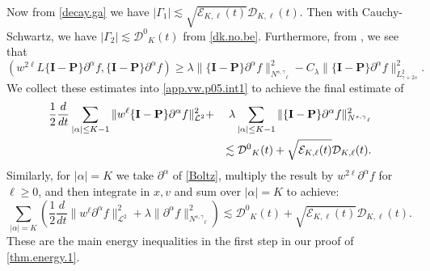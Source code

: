 \documentclass{amsart}
\numberwithin{equation}{section}
\begin{document}
Now from \eqref{decay.ga} we have 
$
\left| {\Gamma}_1 \right| 
\lesssim
\sqrt{{\mathcal{E}}_{{K},{\ell}}(t)}{\mathcal{D}}_{{K},{\ell}}(t).
$
Then with Cauchy-Schwartz, we have
$
\left| {\Gamma}_2 \right|
\lesssim
{{\mathcal{D}}^0}_{K}(t)
$
from \eqref{dk.no.be}.
Furthermore, from \cite[Lemma 2.6]{gsNonCut0}, we see that
$$
 \left( w^{2{\ell}}{L}\{{\mathbf{I}}-{\mathbf{P}}\}{\partial}^{\alpha} {f},\{{\mathbf{I}}-{\mathbf{P}}\} {\partial}^{\alpha}{f}\right)
 \ge {\lambda} \|  \{{\mathbf{I}}-{\mathbf{P}}\}{\partial}^{\alpha}{f}\|_{{N^{s,\gamma}}_{\ell}}^2
 -
 C_\lambda  \|\{{\mathbf{I}}-{\mathbf{P}}\}{\partial}^{\alpha}{f}\|_{L^2_{\gamma+2s}}^2.
$$
We collect these estimates into \eqref{app.vw.p05.int1} to achieve the final estimate of
\begin{eqnarray}
\frac{1}{2}\frac{d}{dt}\sum_{|{\alpha}| \le {K}-1} \|w^{\ell}\{{\mathbf{I}}-{\mathbf{P}}\}{\partial}^{\alpha}{f}\|_{{\mathcal{L}}^2}^2
&+&
{\lambda} \sum_{|{\alpha}| \le {K}-1}\|\{{\mathbf{I}}-{\mathbf{P}}\}{\partial}^{\alpha}{f}\|_{{N^{s,\gamma}}_{\ell}}^2\label{app.vw.p05}
\\
&&\lesssim 
{{\mathcal{D}}^0}_{K}(t)+ \sqrt{{\mathcal{E}}_{{K},{\ell}}(t)}{\mathcal{D}}_{{K},{\ell}}(t).
\notag
\end{eqnarray}
Similarly, for $|{\alpha} | ={K}$ we take ${\partial}^{\alpha}$ of \eqref{Boltz}, multiply the result by $w^{2{\ell}}{\partial}^{\alpha} {f}$ for ${\ell} \ge 0$, and then integrate in $x,{v}$ and sum over $|{\alpha} | ={K}$ to achieve:
\begin{equation}
\sum_{|{\alpha}| = {K}} \left( \frac{1}{2} \frac{d}{dt} \|w^{\ell}{\partial}^{\alpha}{f}\|_{{\mathcal{L}}^2}^2
+
{\lambda} \|{\partial}^{\alpha}{f}\|_{{N^{s,\gamma}}_{\ell}}^2\right)\label{app.vw.pp05}
\lesssim 
{{\mathcal{D}}^0}_{K}(t)+ \sqrt{{\mathcal{E}}_{{K},{\ell}}(t)}{\mathcal{D}}_{{K},{\ell}}(t).
\end{equation}
These are the main energy inequalities in the first step in our proof of \eqref{thm.energy.1}.

\medskip
\end{document}
